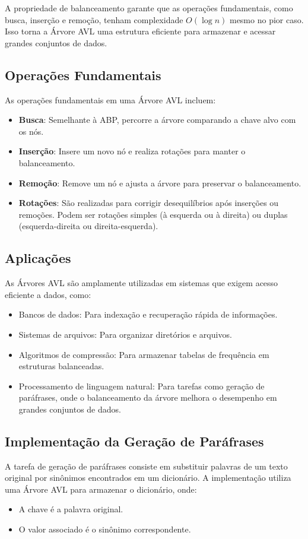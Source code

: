 \documentclass[a4paper, 12pt, english]{article}
\begin{document}
A propriedade de balanceamento garante que as operações fundamentais, como busca, inserção e remoção, tenham complexidade $O(\log n)$ mesmo no pior caso. Isso torna a Árvore AVL uma estrutura eficiente para armazenar e acessar grandes conjuntos de dados.

\subsection{Operações Fundamentais}
As operações fundamentais em uma Árvore AVL incluem:
\begin{itemize}
    \item \textbf{Busca}: Semelhante à ABP, percorre a árvore comparando a chave alvo com os nós.
    \item \textbf{Inserção}: Insere um novo nó e realiza rotações para manter o balanceamento.
    \item \textbf{Remoção}: Remove um nó e ajusta a árvore para preservar o balanceamento.
    \item \textbf{Rotações}: São realizadas para corrigir desequilíbrios após inserções ou remoções. Podem ser rotações simples (à esquerda ou à direita) ou duplas (esquerda-direita ou direita-esquerda).
\end{itemize}

\subsection{Aplicações}
As Árvores AVL são amplamente utilizadas em sistemas que exigem acesso eficiente a dados, como:
\begin{itemize}
    \item Bancos de dados: Para indexação e recuperação rápida de informações.
    \item Sistemas de arquivos: Para organizar diretórios e arquivos.
    \item Algoritmos de compressão: Para armazenar tabelas de frequência em estruturas balanceadas.
    \item Processamento de linguagem natural: Para tarefas como geração de paráfrases, onde o balanceamento da árvore melhora o desempenho em grandes conjuntos de dados.
\end{itemize}

\newpage

\subsection{Implementação da Geração de Paráfrases}
A tarefa de geração de paráfrases consiste em substituir palavras de um texto original por sinônimos encontrados em um dicionário. A implementação utiliza uma Árvore AVL para armazenar o dicionário, onde:
\begin{itemize}
\item A chave é a palavra original.
\item O valor associado é o sinônimo correspondente.
\end{itemize}
\end{document}
